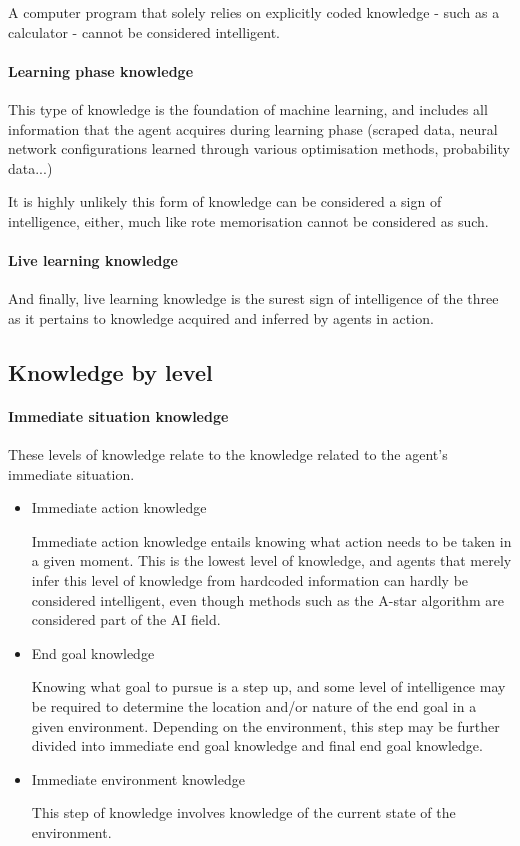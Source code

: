 \documentclass[masterthesis]{fer}
\begin{document}
A computer program that solely relies on explicitly coded knowledge - such as a calculator - cannot be considered intelligent.
\paragraph{Learning phase knowledge}
This type of knowledge is the foundation of machine learning, and includes all information that the agent acquires during learning phase (scraped data, neural network configurations learned through various optimisation methods, probability data...)

It is highly unlikely this form of knowledge can be considered a sign of intelligence, either, much like rote memorisation cannot be considered as such.
\paragraph{Live learning knowledge}
And finally, live learning knowledge is the surest sign of intelligence of the three as it pertains to knowledge acquired and inferred by agents in action.
\subsection{Knowledge by level}
\paragraph{Immediate situation knowledge}

These levels of knowledge relate to the knowledge related to the agent's immediate situation.
\begin{itemize}

\item{Immediate action knowledge}

Immediate action knowledge entails knowing what action needs to be taken in a given moment. This is the lowest level of knowledge, and agents that merely infer this level of knowledge from hardcoded information can hardly be considered intelligent, even though methods such as the A-star algorithm are considered part of the AI field.

\item{End goal knowledge}

Knowing what goal to pursue is a step up, and some level of intelligence may be required to determine the location and/or nature of the end goal in a given environment. Depending on the environment, this step may be further divided into immediate end goal knowledge and final end goal knowledge.

\item{Immediate environment knowledge}

This step of knowledge involves knowledge of the current state of the environment.

\end{itemize}
\end{document}
